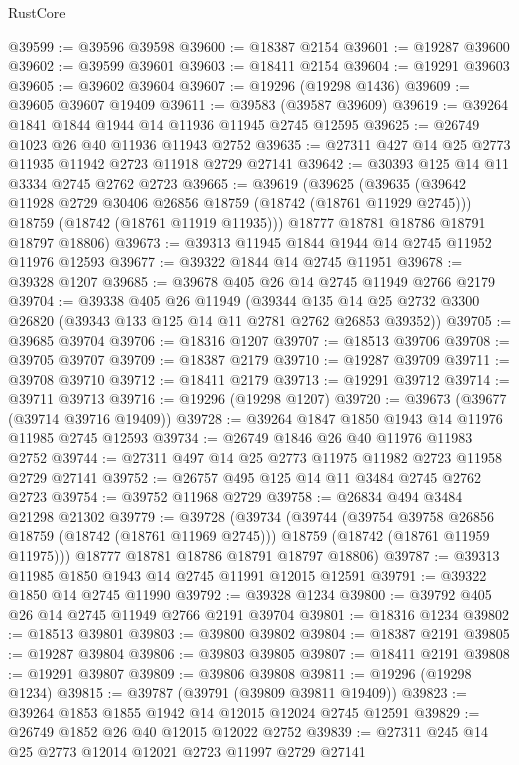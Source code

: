 \begin{lexlean}{RustCore}
\begin{coremodule}
@39599 := @39596 @39598
@39600 := @18387 @2154
@39601 := @19287 @39600
@39602 := @39599 @39601
@39603 := @18411 @2154
@39604 := @19291 @39603
@39605 := @39602 @39604
@39607 := @19296 (@19298 @1436)
@39609 := @39605 @39607 @19409
@39611 := @39583 (@39587 @39609)
@39619 := @39264 @1841 @1844 @1944 @14 @11936 @11945 @2745 @12595
@39625 := @26749 @1023 @26 @40 @11936 @11943 @2752
@39635 := @27311 @427 @14 @25 @2773 @11935 @11942 @2723 @11918 @2729 @27141
@39642 := @30393 @125 @14 @11 @3334 @2745 @2762 @2723
@39665 := @39619
    (@39625
      (@39635
        (@39642 @11928 @2729 @30406 @26856 @18759 (@18742 (@18761 @11929 @2745)))
        @18759
        (@18742 (@18761 @11919 @11935)))
      @18777
      @18781
      @18786
      @18791
      @18797
      @18806)
@39673 := @39313 @11945 @1844 @1944 @14 @2745 @11952 @11976 @12593
@39677 := @39322 @1844 @14 @2745 @11951
@39678 := @39328 @1207
@39685 := @39678 @405 @26 @14 @2745 @11949 @2766 @2179
@39704 := @39338
    @405
    @26
    @11949
    (@39344 @135 @14 @25 @2732 @3300 @26820 (@39343 @133 @125 @14 @11 @2781 @2762 @26853 @39352))
@39705 := @39685 @39704
@39706 := @18316 @1207
@39707 := @18513 @39706
@39708 := @39705 @39707
@39709 := @18387 @2179
@39710 := @19287 @39709
@39711 := @39708 @39710
@39712 := @18411 @2179
@39713 := @19291 @39712
@39714 := @39711 @39713
@39716 := @19296 (@19298 @1207)
@39720 := @39673 (@39677 (@39714 @39716 @19409))
@39728 := @39264 @1847 @1850 @1943 @14 @11976 @11985 @2745 @12593
@39734 := @26749 @1846 @26 @40 @11976 @11983 @2752
@39744 := @27311 @497 @14 @25 @2773 @11975 @11982 @2723 @11958 @2729 @27141
@39752 := @26757 @495 @125 @14 @11 @3484 @2745 @2762 @2723
@39754 := @39752 @11968 @2729
@39758 := @26834 @494 @3484 @21298 @21302
@39779 := @39728
    (@39734
      (@39744
        (@39754 @39758 @26856 @18759 (@18742 (@18761 @11969 @2745)))
        @18759
        (@18742 (@18761 @11959 @11975)))
      @18777
      @18781
      @18786
      @18791
      @18797
      @18806)
@39787 := @39313 @11985 @1850 @1943 @14 @2745 @11991 @12015 @12591
@39791 := @39322 @1850 @14 @2745 @11990
@39792 := @39328 @1234
@39800 := @39792 @405 @26 @14 @2745 @11949 @2766 @2191 @39704
@39801 := @18316 @1234
@39802 := @18513 @39801
@39803 := @39800 @39802
@39804 := @18387 @2191
@39805 := @19287 @39804
@39806 := @39803 @39805
@39807 := @18411 @2191
@39808 := @19291 @39807
@39809 := @39806 @39808
@39811 := @19296 (@19298 @1234)
@39815 := @39787 (@39791 (@39809 @39811 @19409))
@39823 := @39264 @1853 @1855 @1942 @14 @12015 @12024 @2745 @12591
@39829 := @26749 @1852 @26 @40 @12015 @12022 @2752
@39839 := @27311 @245 @14 @25 @2773 @12014 @12021 @2723 @11997 @2729 @27141

\end{coremodule}
\end{lexlean}
